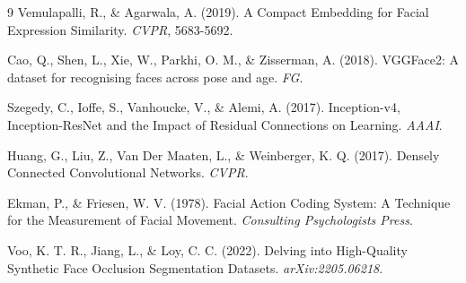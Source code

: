\documentclass[10pt,twocolumn]{article}
\begin{document}
\begin{thebibliography}{9}
Vemulapalli, R., \& Agarwala, A. (2019). A Compact Embedding for Facial Expression Similarity. \textit{CVPR}, 5683-5692.

Cao, Q., Shen, L., Xie, W., Parkhi, O. M., \& Zisserman, A. (2018). VGGFace2: A dataset for recognising faces across pose and age. \textit{FG}.

Szegedy, C., Ioffe, S., Vanhoucke, V., \& Alemi, A. (2017). Inception-v4, Inception-ResNet and the Impact of Residual Connections on Learning. \textit{AAAI}.

Huang, G., Liu, Z., Van Der Maaten, L., \& Weinberger, K. Q. (2017). Densely Connected Convolutional Networks. \textit{CVPR}.

Ekman, P., \& Friesen, W. V. (1978). Facial Action Coding System: A Technique for the Measurement of Facial Movement. \textit{Consulting Psychologists Press}.

Voo, K. T. R., Jiang, L., \& Loy, C. C. (2022). Delving into High-Quality Synthetic Face Occlusion Segmentation Datasets. \textit{arXiv:2205.06218}.
\end{thebibliography}
\end{document}
